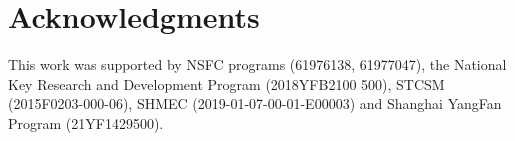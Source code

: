 \section{Acknowledgments}

This work was supported by NSFC programs (61976138, 61977047), the National Key Research and Development Program (2018YFB2100 500), STCSM (2015F0203-000-06), SHMEC (2019-01-07-00-01-E00003) and Shanghai YangFan Program (21YF1429500).
